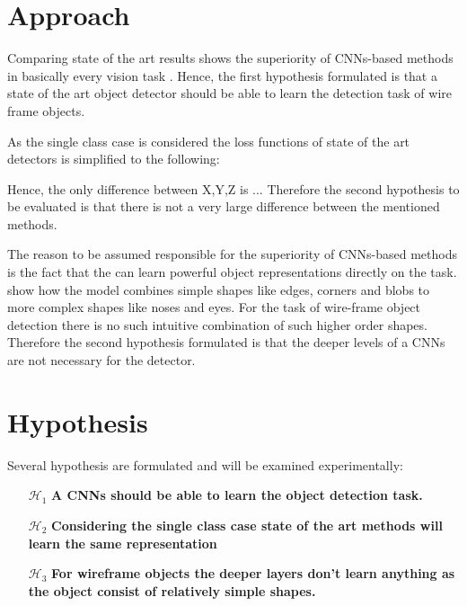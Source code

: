 



\section{Approach}
\label{sec:object_detection:approach}
Comparing state of the art results shows the superiority of \acp{CNN}-based methods in basically every vision task . Hence, the first hypothesis formulated is that a state of the art object detector should be able to learn the detection task of wire frame objects. 

As the single class case is considered the loss functions of state of the art detectors is simplified to the following:


Hence, the only difference between X,Y,Z is ...
Therefore the second hypothesis to be evaluated is that there is not a very large difference between the mentioned methods.


The reason to be assumed responsible for the superiority of \acp{CNN}-based methods is the fact that the can learn powerful object representations directly on the task.  show how the model combines simple shapes like edges, corners and blobs to more complex shapes like noses and eyes. For the task of wire-frame object detection there is no such intuitive combination of such higher order shapes. Therefore the second hypothesis formulated is that the deeper levels of a \acp{CNN} are not necessary for the detector.

\section{Hypothesis}

\label{sec:object_detection:hypothesis}
Several hypothesis are formulated and will be examined experimentally:
\begin{enumerate}
	\item[$\mathcal{H}_1$] \textbf{A \acp{CNN} should be able to learn the object detection task.}
	\item[$\mathcal{H}_2$] \textbf{Considering the single class case state of the art methods will learn the same representation}
	\item[$\mathcal{H}_3$] \textbf{For wireframe objects the deeper layers don't learn anything as the object consist of relatively simple shapes.}
	
\end{enumerate}
\newpage
